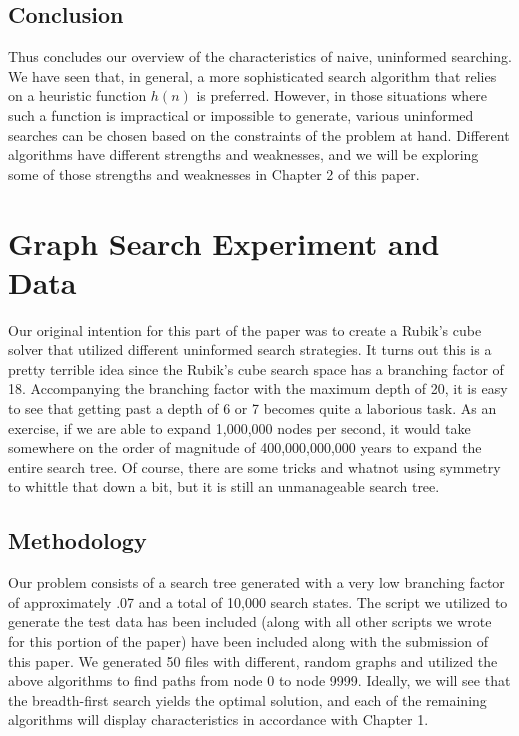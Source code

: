 \documentclass[a4paper,11pt]{report}
\begin{document}
\section{Conclusion}
Thus concludes our overview of the characteristics of naive, uninformed
searching.  We have seen that, in general, a more sophisticated search
algorithm that relies on a heuristic function $h(n)$ is preferred.  However, in
those situations where such a function is impractical or impossible to
generate, various uninformed searches can be chosen based on the constraints of
the problem at hand.  Different algorithms have different strengths and
weaknesses, and we will be exploring some of those strengths and weaknesses in
Chapter 2 of this paper.

\chapter{Graph Search Experiment and Data}
Our original intention for this part of the paper was to create a Rubik's cube
solver that utilized different uninformed search strategies.  It turns out this
is a pretty terrible idea since the Rubik's cube search space has a branching
factor of 18. Accompanying the branching factor with the maximum depth of 20,
it is easy to see that getting past a depth of 6 or 7 becomes quite a laborious
task. As an exercise, if we are able to expand 1,000,000 nodes per second, it
would take somewhere on the order of magnitude of 400,000,000,000 years to
expand the entire search tree.  Of course, there are some tricks and whatnot
using symmetry to whittle that down a bit, but it is still an unmanageable
search tree.\newline

\section{Methodology}
Our problem consists of a search tree generated with a very low branching
factor of approximately .07 and a total of 10,000 search states. The script we
utilized to generate the test data has been included (along with all other
scripts we wrote for this portion of the paper) have been included along with
the submission of this paper.  We generated 50 files with different, random
graphs and utilized the above algorithms to find paths from node 0 to node
9999.  Ideally, we will see that the breadth-first search yields the optimal
solution, and each of the remaining algorithms will display characteristics in
accordance with Chapter 1.
\end{document}
